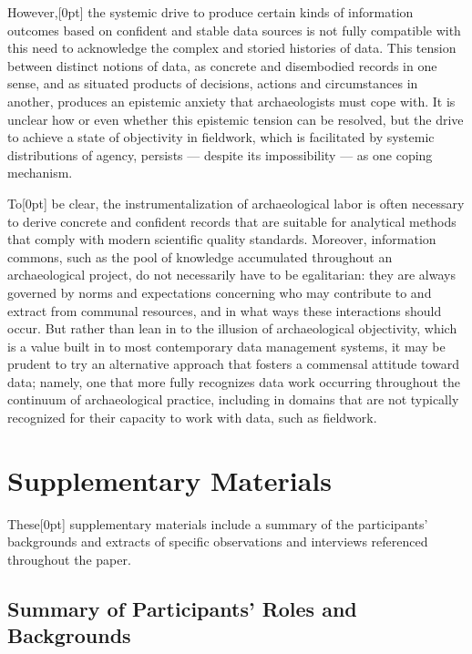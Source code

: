 \documentclass[
]{article}
\newcommand{\paragraphnumber}[1]{\marginnote{\color{lightgray}\tiny{#1}}[0pt]}
\begin{document}
However,\paragraphnumber{[47]} the systemic drive to produce certain
kinds of information outcomes based on confident and stable data sources
is not fully compatible with this need to acknowledge the complex and
storied histories of data. This tension between distinct notions of
data, as concrete and disembodied records in one sense, and as situated
products of decisions, actions and circumstances in another, produces an
epistemic anxiety that archaeologists must cope with. It is unclear how
or even whether this epistemic tension can be resolved, but the drive to
achieve a state of objectivity in fieldwork, which is facilitated by
systemic distributions of agency, persists --- despite its impossibility
--- as one coping mechanism.

To\paragraphnumber{[48]} be clear, the instrumentalization of
archaeological labor is often necessary to derive concrete and confident
records that are suitable for analytical methods that comply with modern
scientific quality standards. Moreover, information commons, such as the
pool of knowledge accumulated throughout an archaeological project, do
not necessarily have to be egalitarian: they are always governed by
norms and expectations concerning who may contribute to and extract from
communal resources, and in what ways these interactions should occur.
But rather than lean in to the illusion of archaeological objectivity,
which is a value built in to most contemporary data management systems,
it may be prudent to try an alternative approach that fosters a
commensal attitude toward data; namely, one that more fully recognizes
data work occurring throughout the continuum of archaeological practice,
including in domains that are not typically recognized for their
capacity to work with data, such as fieldwork.

\newpage

\section{Supplementary Materials}\label{supplementary-materials}

These\paragraphnumber{[49]} supplementary materials include a summary of
the participants' backgrounds and extracts of specific observations and
interviews referenced throughout the paper.

\subsection{Summary of Participants' Roles and
Backgrounds}\label{summary-of-participants-roles-and-backgrounds}
\end{document}

